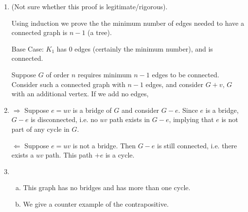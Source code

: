 \documentclass[11pt]{article}
\begin{document}
\begin{enumerate}[1.]
    \item %
        (Not sure whether this proof is legitimate/rigorous).

        Using induction we prove the the minimum number of edges needed to have 
        a connected graph is $n - 1$ (a tree). 

        Base Case: $K_1$ has $0$ edges (certainly the minimum number), and is connected.

        Suppose $G$ of order $n$ requires minimum ${n - 1}$ edges to be connected.
        Consider such a connected graph with $n - 1$ edges, and consider $G + {v}$,
        $G$ with an additional vertex. If we add no edges, 

    \item %
        $\Rightarrow$ Suppose $e = uv$ is a bridge of $G$ and consider $G-e$. Since
        $e$ is a bridge, $G-e$ is disconnected, i.e. no $uv$ path exists in $G-e$,
        implying that $e$ is not part of any cycle in $G$. 


        $\Leftarrow$ Suppose $e = uv$ is not a bridge. Then $G - e$ is still connected, 
        i.e. there exists a $uv$ path. This path $+ e$ is a cycle.

    \item %
        \begin{enumerate}[a)]
            \item

                This graph has no bridges and has more than one cycle.
            \item 
                We give a counter example of the contrapositive. 

\end{enumerate}
\end{enumerate}
\end{document}
